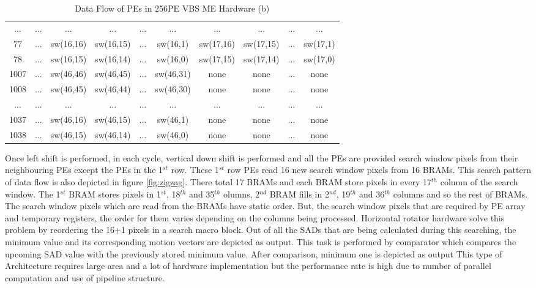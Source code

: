 \begin{table}[htbp]
\begin{tabular}{|c|c|c|c|c|c|c|c|c|c|}
		... & ... & ... & ... & ... & ... & ... & ... & ... & ... \\
		
		77 & ... & sw(16,16) & sw(16,15) & ... & sw(16,1) & sw(17,16) & sw(17,15) & ... & sw(17,1) \\
		
		78 & ... & sw(16,15) & sw(16,14) & ... & sw(16,0) & sw(17,15) & sw(17,14) & ... & sw(17,0)  \\
		
		\hline
		
		1007 & ... & sw(46,46) & sw(46,45) & ... & sw(46,31) & none & none & ... & none \\
		
		1008 & ... & sw(46,45) & sw(46,44) & ... & sw(46,30) & none & none & ... & none \\
		
		... & ... & ... & ... & ... & ... & ... & ... & ... & ... \\
		
		1037 & ... & sw(46,16) & sw(46,15) & ... & sw(46,1) & none & none & ... & none \\
		
		1038 & ... & sw(46,15) & sw(46,14) & ... & sw(46,0) & none & none & ... & none  \\
		
		\hline
	\end{tabular}
	\caption{ Data Flow of PEs in 256PE VBS ME Hardware (b)}
\end{table}

Once left shift is performed, in each cycle, vertical down shift is performed and all the PEs are provided search window pixels from their neighbouring PEs except the PEs in the 1$^{st}$ row.  These 1$^{st}$ row PEs read 16 new search window pixels from 16 BRAMs. This search pattern of data flow is also depicted in figure \ref{fig:zigzag}. There total 17 BRAMs and each BRAM store pixels in every 17$^{th}$ column of the search window. The 1$^{st}$ BRAM stores pixels in 1$^{st}$, 18$^{th}$ and 35$^{th}$ olumns, 2$^{nd}$ BRAM fills in 2$^{nd}$, 19$^{th}$ and 36$^{th}$ columns and so the rest of BRAMs. The search window pixels which are read from the BRAMs have static order. But, the search window pixels that are required by PE array and temporary registers, the order for them varies depending on the columns being processed. Horizontal rotator hardware solve this problem by reordering the 16+1 pixels in a search macro block. Out of all the SADs that are being calculated during this searching, the minimum value and its corresponding motion vectors are depicted as output. This task is performed by comparator which compares the upcoming SAD value with the previously stored minimum value. After comparison, minimum one is depicted as output This type of Architecture requires large area and a lot of hardware implementation but the performance rate is high due to number of parallel computation and use of pipeline structure.